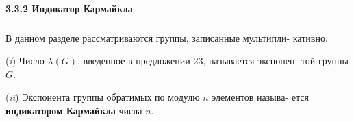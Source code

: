\documentclass{../template/mai_book}
\begin{document}
\paragraph{3.3.2 Индикатор Кармайкла}
\subparagraph{}
В данном разделе рассматриваются группы, записанные мультипли­-\linebreak
кативно.
\begin{determ}
\par \quad\;  (\textit{i})	Число $\lambda (G)$, введенное в предложении 23, называется экспонен-\linebreak­
той группы $G$.
\par  (\textit{ii}) Экспонента группы обратимых по модулю $n$ элементов называ­-\linebreak
ется \textbf{индикатором Кармайкла} числа $n$.
\end{determ}
\end{document}
